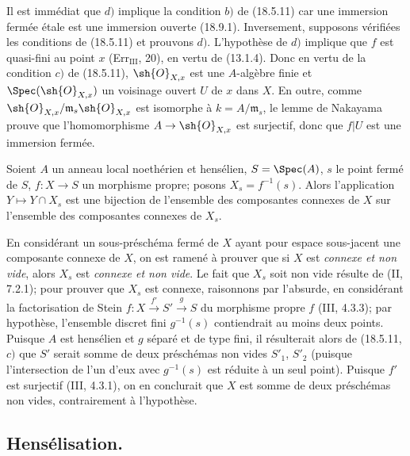 
Il est immédiat que $d)$ implique la condition $b)$ de (18.5.11) car une immersion fermée étale est une immersion ouverte (18.9.1). Inversement, supposons vérifiées les conditions de (18.5.11) et prouvons $d)$. L'hypothèse de $d)$ implique que $f$ est quasi-fini au point $x$ (Err$_{\mathrm{III}}$, 20), en vertu de (13.1.4). Donc en vertu de la condition $c)$ de (18.5.11), $\sh{O}_{X,x}$ est une $A$-algèbre finie et $\Spec(\sh{O}_{X,x})$ un voisinage ouvert $U$ de $x$ dans $X$. En outre, comme $\sh{O}_{X,x}/\mathfrak m_s\sh{O}_{X,x}$ est isomorphe à $k=A/\mathfrak m_s$, le lemme de Nakayama prouve que l'homomorphisme $A\to\sh{O}_{X,x}$ est surjectif, donc que $f|U$ est une immersion fermée.

\begin{proposition}[18.5.19]
\label{IV.18.5.19}
Soient $A$ un anneau local noethérien et hensélien, $S=\Spec(A)$, $s$ le point fermé de $S$, $f:X\to S$ un morphisme propre; posons $X_s=f^{-1}(s)$. Alors l'application $Y\longmapsto Y\cap X_s$ est une bijection de l'ensemble des composantes connexes de $X$ sur l'ensemble des composantes connexes de $X_s$.
\end{proposition}

En considérant un sous-préschéma fermé de $X$ ayant pour espace sous-jacent une composante connexe de $X$, on est ramené à prouver que si $X$ est \emph{connexe et non vide}, alors $X_s$ est \emph{connexe et non vide}. Le fait que $X_s$ soit non vide résulte de (II, 7.2.1); pour prouver que $X_s$ est connexe, raisonnons par l'absurde, en considérant la factorisation de Stein $f:X\xrightarrow{f'}S'\xrightarrow{g}S$ du morphisme propre $f$ (III, 4.3.3); par hypothèse, l'ensemble discret fini $g^{-1}(s)$ contiendrait au moins deux points. Puisque $A$ est hensélien et $g$ séparé et de type fini, il résulterait alors de (18.5.11, $c)$ que $S'$ serait somme de deux préschémas non vides $S'_1$, $S'_2$ (puisque l'intersection de l'un d'eux avec $g^{-1}(s)$ est réduite à un seul point). Puisque $f'$ est surjectif (III, 4.3.1), on en conclurait que $X$ est somme de deux préschémas non vides, contrairement à l'hypothèse.

\subsection{Hensélisation.}

